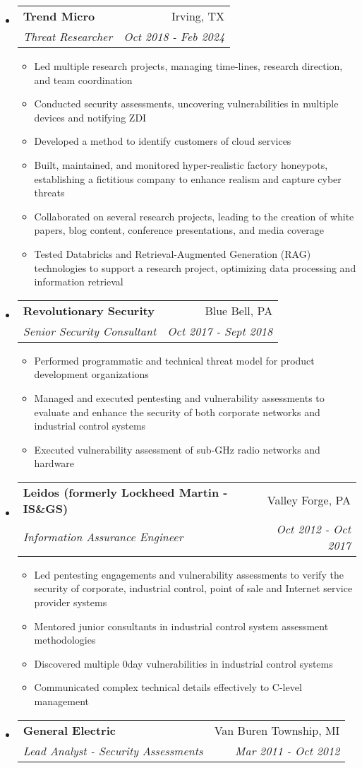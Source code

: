 \documentclass[letterpaper,11pt]{article}
\makeatletter
\newcommand{\resitem}[1]{\item #1 \vspace{-2pt}}
\newcommand{\ressubheading}[4]{
\begin{tabular*}{7.0in}{l@{\extracolsep{\fill}}r}
		\textbf{#1} & #2 \\
		\textit{#3} & \textit{#4} \\
\end{tabular*}\vspace{-6pt}}
\makeatother
\begin{document}
	\begin{itemize}
	\item
		\ressubheading{Trend Micro}{Irving, TX}{Threat Researcher}{Oct 2018 - Feb 2024}
		\begin{itemize}
			\resitem{Led multiple research projects, managing time-lines, research direction, and team coordination}			
			\resitem{Conducted security assessments, uncovering vulnerabilities in multiple devices and notifying ZDI}
			\resitem{Developed a method to identify customers of cloud services}
			\resitem{Built, maintained, and monitored hyper-realistic factory honeypots, establishing a fictitious company to enhance realism and capture cyber threats}
			\resitem{Collaborated on several research projects, leading to the creation of white papers, blog content, conference presentations, and media coverage}
			\resitem{Tested Databricks and Retrieval-Augmented Generation (RAG) technologies to support a research project, optimizing data processing and information retrieval}
		\end{itemize}	
	\item
		\ressubheading{Revolutionary Security}{Blue Bell, PA}{Senior Security Consultant}{Oct 2017 - Sept 2018}
		\begin{itemize}
			\resitem{Performed programmatic and technical threat model for product development organizations}			
			\resitem{Managed and executed pentesting and vulnerability assessments to evaluate and enhance the security of both corporate networks and industrial control systems}
			\resitem{Executed vulnerability assessment of sub-GHz radio networks and hardware}
		\end{itemize}
	\item
		\ressubheading{Leidos (formerly Lockheed Martin - IS\&GS)}{Valley Forge, PA}{Information Assurance Engineer}{Oct 2012 - Oct 2017}
		\begin{itemize}
			\resitem{Led pentesting engagements and vulnerability assessments to verify the security of corporate, industrial control, point of sale and Internet service provider systems}
			\resitem{Mentored junior consultants in industrial control system assessment methodologies}
			\resitem{Discovered multiple 0day vulnerabilities in industrial control systems}
			\resitem{Communicated complex technical details effectively to C-level management}
		\end{itemize}
	\item
		\ressubheading{General Electric}{Van Buren Township, MI}{Lead Analyst - Security Assessments}{Mar 2011 - Oct 2012}

\end{itemize}
\end{document}
